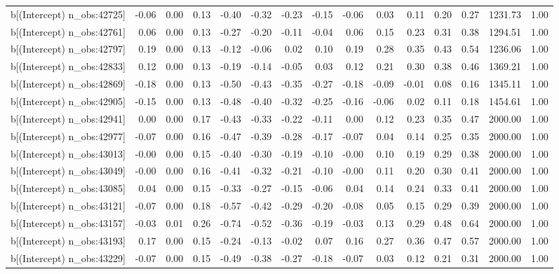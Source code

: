\begin{table}[ht]
\begin{tabular}{rrrrrrrrrrrrrrr}
  b[(Intercept) n\_obs:42725] & -0.06 & 0.00 & 0.13 & -0.40 & -0.32 & -0.23 & -0.15 & -0.06 & 0.03 & 0.11 & 0.20 & 0.27 & 1231.73 & 1.00 \\ 
  b[(Intercept) n\_obs:42761] & 0.06 & 0.00 & 0.13 & -0.27 & -0.20 & -0.11 & -0.04 & 0.06 & 0.15 & 0.23 & 0.31 & 0.38 & 1294.51 & 1.00 \\ 
  b[(Intercept) n\_obs:42797] & 0.19 & 0.00 & 0.13 & -0.12 & -0.06 & 0.02 & 0.10 & 0.19 & 0.28 & 0.35 & 0.43 & 0.54 & 1236.06 & 1.00 \\ 
  b[(Intercept) n\_obs:42833] & 0.12 & 0.00 & 0.13 & -0.19 & -0.14 & -0.05 & 0.03 & 0.12 & 0.21 & 0.30 & 0.38 & 0.46 & 1369.21 & 1.00 \\ 
  b[(Intercept) n\_obs:42869] & -0.18 & 0.00 & 0.13 & -0.50 & -0.43 & -0.35 & -0.27 & -0.18 & -0.09 & -0.01 & 0.08 & 0.16 & 1345.11 & 1.00 \\ 
  b[(Intercept) n\_obs:42905] & -0.15 & 0.00 & 0.13 & -0.48 & -0.40 & -0.32 & -0.25 & -0.16 & -0.06 & 0.02 & 0.11 & 0.18 & 1454.61 & 1.00 \\ 
  b[(Intercept) n\_obs:42941] & 0.00 & 0.00 & 0.17 & -0.43 & -0.33 & -0.22 & -0.11 & 0.00 & 0.12 & 0.23 & 0.35 & 0.47 & 2000.00 & 1.00 \\ 
  b[(Intercept) n\_obs:42977] & -0.07 & 0.00 & 0.16 & -0.47 & -0.39 & -0.28 & -0.17 & -0.07 & 0.04 & 0.14 & 0.25 & 0.35 & 2000.00 & 1.00 \\ 
  b[(Intercept) n\_obs:43013] & -0.00 & 0.00 & 0.15 & -0.40 & -0.30 & -0.19 & -0.10 & -0.00 & 0.10 & 0.19 & 0.29 & 0.38 & 2000.00 & 1.00 \\ 
  b[(Intercept) n\_obs:43049] & -0.00 & 0.00 & 0.16 & -0.41 & -0.32 & -0.21 & -0.10 & -0.00 & 0.11 & 0.20 & 0.30 & 0.41 & 2000.00 & 1.00 \\ 
  b[(Intercept) n\_obs:43085] & 0.04 & 0.00 & 0.15 & -0.33 & -0.27 & -0.15 & -0.06 & 0.04 & 0.14 & 0.24 & 0.33 & 0.41 & 2000.00 & 1.00 \\ 
  b[(Intercept) n\_obs:43121] & -0.07 & 0.00 & 0.18 & -0.57 & -0.42 & -0.29 & -0.20 & -0.08 & 0.05 & 0.15 & 0.29 & 0.39 & 2000.00 & 1.00 \\ 
  b[(Intercept) n\_obs:43157] & -0.03 & 0.01 & 0.26 & -0.74 & -0.52 & -0.36 & -0.19 & -0.03 & 0.13 & 0.29 & 0.48 & 0.64 & 2000.00 & 1.00 \\ 
  b[(Intercept) n\_obs:43193] & 0.17 & 0.00 & 0.15 & -0.24 & -0.13 & -0.02 & 0.07 & 0.16 & 0.27 & 0.36 & 0.47 & 0.57 & 2000.00 & 1.00 \\ 
  b[(Intercept) n\_obs:43229] & -0.07 & 0.00 & 0.15 & -0.49 & -0.38 & -0.27 & -0.18 & -0.07 & 0.03 & 0.12 & 0.21 & 0.31 & 2000.00 & 1.00 \\ 

\end{tabular}
\end{table}

